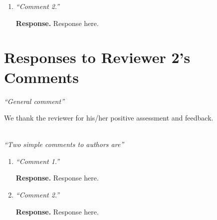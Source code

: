 \documentclass[11pt]{article}
\begin{document}
\begin{enumerate}[label=R1.\arabic*]
\begin{bullets}
\begin{bullets}
\begin{bullets}
\begin{bullets}
\begin{bullets}
\begin{bullets}
                              \end{bullets}

                          \end{bullets}

                      \end{bullets}

                  \end{bullets}

              \end{bullets}

          \end{bullets}



          \item{\it ``Comment 2.''}

                {\bf Response.} Response here.
\end{enumerate}

\section*{Responses to Reviewer 2's Comments}

 {\it ``General comment''}

\vspace*{0.5em} 
We thank the reviewer for
his/her positive assessment and feedback.

~\\[.1cm]
\noindent\emph{``Two simple comments to authors are''}
\begin{enumerate}[label=R2.\arabic*]

    \item {\it ``Comment 1.''}

          {\bf Response.} Response here.


          \item{\it ``Comment 2.''}

                {\bf Response.} Response here.
\end{enumerate}

\printmybibliography
\end{document}

